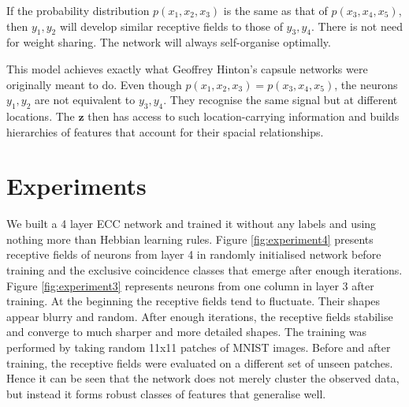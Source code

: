 \documentclass[12pt]{article}
\begin{document}
If the probability distribution $p(x_1,x_2,x_3)$ is the same as that of $p(x_3,x_4,x_5)$, then $y_1,y_2$ will develop similar receptive fields to those of $y_3,y_4$. There is not need for weight sharing. The network will always self-organise optimally. 

This model achieves exactly what Geoffrey Hinton's capsule networks were originally meant to do. Even though $p(x_1,x_2,x_3)=p(x_3,x_4,x_5)$, the neurons 
 $y_1,y_2$  are not equivalent to $y_3,y_4$. They recognise the same signal but at different locations. The $\boldsymbol{z}$ then has access to such location-carrying information and builds hierarchies of features that account for their spacial relationships. 

\section{Experiments}

We built a 4 layer ECC network and trained it without any labels and using nothing more than Hebbian learning rules. Figure \ref{fig:experiment4} presents receptive fields of neurons from layer 4 in randomly initialised network before training and the exclusive coincidence classes that emerge after enough iterations. Figure \ref{fig:experiment3} represents neurons from one column in layer 3 after training.
At the beginning the receptive fields tend to fluctuate. Their shapes appear blurry and random. After enough iterations, the receptive fields stabilise and converge to much sharper and more detailed shapes. The training was performed by taking random 11x11 patches of MNIST images. Before and after training, the receptive fields were evaluated on a different set of  unseen patches. Hence it can be seen that the network does not merely cluster
the observed data, but instead it forms robust classes of features that generalise well.
\end{document}
